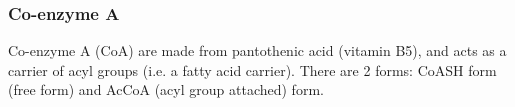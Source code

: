 \subsubsection{Co-enzyme A}

Co-enzyme A (CoA) are made from pantothenic acid (vitamin B5), and acts as a carrier of acyl groups (i.e. a fatty acid carrier).
There are 2 forms: CoASH form (free form) and AcCoA (acyl group attached) form.

\begin{center}
    \setatomsep{2em}
     
     
\end{center}

